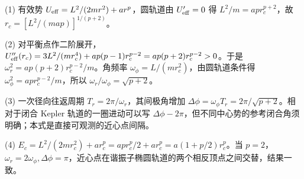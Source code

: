 (1) 有效势 \(U_{\rm eff}=L^2/(2mr^2)+ar^p\)，圆轨道由 \(U'_{\rm eff}=0\) 得 \(L^2/m=ap r_c^{p+2}\)，故 \(r_c=[L^2/(map)]^{1/(p+2)}\)。

(2) 对平衡点作二阶展开，\(U''_{\rm eff}(r_c)=3L^2/(mr_c^4)+ap(p-1)r_c^{p-2}=ap(p+2)r_c^{p-2}>0\)。于是 \(\omega_r^2=ap(p+2)r_c^{p-2}/m\)。角频率 \(\omega_\phi=L/(mr_c^2)\)，由圆轨道条件得 \(\omega_\phi^2=ap r_c^{p-2}/m\)，所以 \(\omega_r/\omega_\phi=\sqrt{p+2}\)。

(3) 一次径向往返周期 \(T_r=2\pi/\omega_r\)，其间极角增加 \(\Delta\phi=\omega_\phi T_r=2\pi/\sqrt{p+2}\)。相对于闭合 Kepler 轨道的一圈进动可以写 \(\Delta\phi-2\pi\)，但不同中心势的参考闭合角须明确；本式是直接可观测的近心点间隔。

(4) \(E_c=L^2/(2mr_c^2)+ar_c^p=ap r_c^p/2+ar_c^p=a(1+p/2)r_c^p\)。当 \(p=2\)，\(\omega_r=2\omega_\phi,\Delta\phi=\pi\)，近心点在谐振子椭圆轨道的两个相反顶点之间交替，结果一致。
